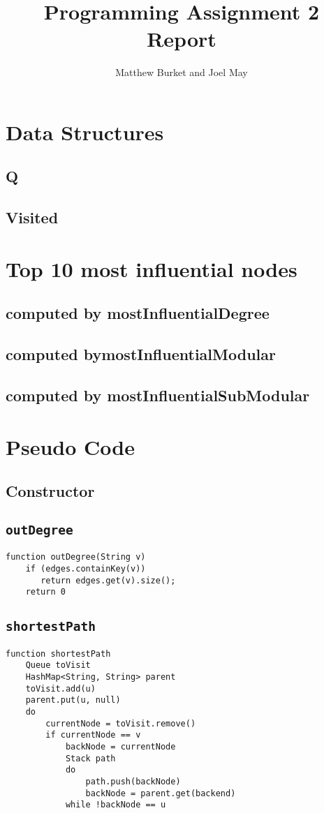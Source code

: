 \documentclass[10pt,letterpaper]{article}
\author{Matthew Burket and Joel May}
\title{Programming Assignment 2 Report}
\begin{document}
\maketitle
\section{Data Structures}
\subsection{Q}
\subsection{Visited}
\section{Top 10 most influential nodes}
\subsection{computed by mostInfluentialDegree}
\subsection{computed bymostInfluentialModular}
\subsection{computed by mostInfluentialSubModular}
\section{Pseudo Code}
\subsection{Constructor}
\subsection{\texttt{outDegree}}
\begin{verbatim}
function outDegree(String v)
    if (edges.containKey(v))
       return edges.get(v).size();
	return 0
\end{verbatim}
\subsection{\texttt{shortestPath}}
\begin{verbatim}
function shortestPath
   	Queue toVisit
   	HashMap<String, String> parent
   	toVisit.add(u)
   	parent.put(u, null)
   	do
   		currentNode = toVisit.remove()
   		if currentNode == v
   			backNode = currentNode
   			Stack path
   			do 
   				path.push(backNode)
   				backNode = parent.get(backend)
   			while !backNode == u
   			
\end{verbatim}
\end{document}
